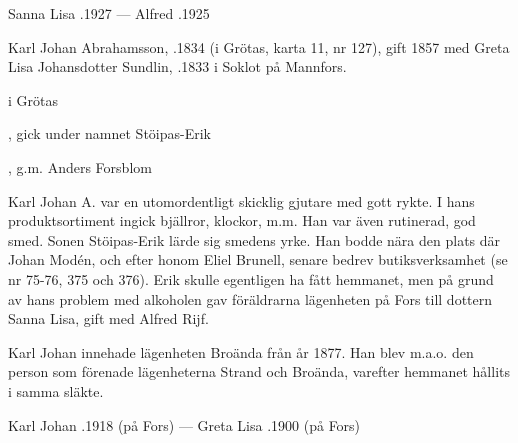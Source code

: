 
Sanna Lisa .1927  ---  Alfred .1925





Karl Johan Abrahamsson, .1834 (i Grötas, karta 11, nr 127), gift 1857 med Greta Lisa Johansdotter Sundlin, .1833 i Soklot på Mannfors.
\begin{jhchildren}
  \item {} i Grötas
  \item {}
  \item {}, gick under namnet Stöipas-Erik
  \item {}
  \item {}
  \item {}, g.m. Anders Forsblom
\end{jhchildren}

Karl Johan A. var en utomordentligt skicklig gjutare med gott rykte. I hans produktsortiment ingick bjällror, klockor, m.m. Han var även rutinerad, god smed. Sonen Stöipas-Erik lärde sig smedens yrke. Han bodde nära den plats där Johan Modén, och efter honom Eliel Brunell, senare bedrev butiksverksamhet (se nr 75-76, 375 och 376). Erik skulle egentligen ha fått hemmanet, men på grund av hans problem med alkoholen gav föräldrarna lägenheten på Fors till dottern Sanna Lisa, gift med Alfred Rijf.

Karl Johan innehade lägenheten Broända från år 1877. Han blev m.a.o. den person som förenade lägenheterna Strand och Broända, varefter hemmanet hållits i samma släkte.

Karl Johan .1918 (på Fors)  ---  Greta Lisa .1900 (på Fors)



